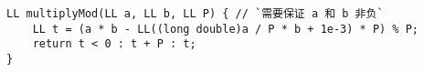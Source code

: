 \begin{lstlisting}
LL multiplyMod(LL a, LL b, LL P) { // `需要保证 a 和 b 非负`
	LL t = (a * b - LL((long double)a / P * b + 1e-3) * P) % P;
	return t < 0 : t + P : t;
}
\end{lstlisting}
